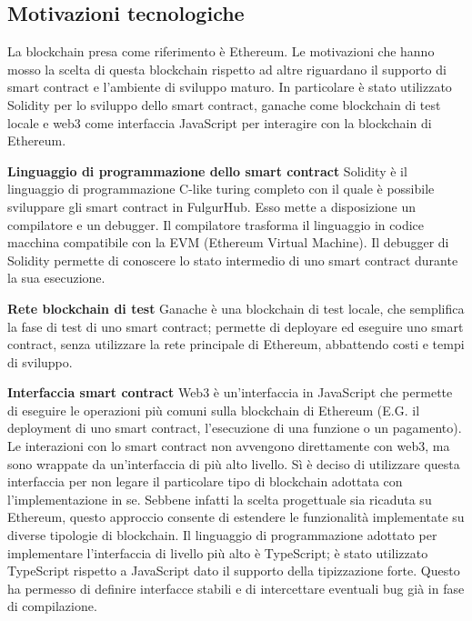 \documentclass[12pt,italian,]{book}
\begin{document}
\hypertarget{motivazioni-tecnologiche}{%
\subsection{Motivazioni tecnologiche}\label{motivazioni-tecnologiche}}

La blockchain presa come riferimento è Ethereum. Le motivazioni che hanno mosso la scelta di questa blockchain rispetto ad altre riguardano il supporto di smart contract e l'ambiente di sviluppo maturo. In particolare è stato utilizzato Solidity per lo sviluppo dello smart contract, ganache come blockchain di test locale e web3 come interfaccia JavaScript per interagire con la blockchain di Ethereum.

\textbf{\textbf{Linguaggio di programmazione dello smart contract}} Solidity è il linguaggio di programmazione C-like turing completo con il quale è possibile sviluppare gli smart contract in FulgurHub. Esso mette a disposizione un compilatore e un debugger. Il compilatore trasforma il linguaggio in codice macchina compatibile con la EVM (Ethereum Virtual Machine). Il debugger di Solidity permette di conoscere lo stato intermedio di uno smart contract durante la sua esecuzione.

\textbf{\textbf{Rete blockchain di test}} Ganache è una blockchain di test locale, che semplifica la fase di test di uno smart contract; permette di deployare ed eseguire uno smart contract, senza utilizzare la rete principale di Ethereum, abbattendo costi e tempi di sviluppo.

\textbf{\textbf{Interfaccia smart contract}} Web3 è un'interfaccia in JavaScript che permette di eseguire le operazioni più comuni sulla blockchain di Ethereum (E.G. il deployment di uno smart contract, l'esecuzione di una funzione o un pagamento). Le interazioni con lo smart contract non avvengono direttamente con web3, ma sono wrappate da un'interfaccia di più alto livello. Sì è deciso di utilizzare questa interfaccia per non legare il particolare tipo di blockchain adottata con l'implementazione in se. Sebbene infatti la scelta progettuale sia ricaduta su Ethereum, questo approccio consente di estendere le funzionalità implementate su diverse tipologie di blockchain. Il linguaggio di programmazione adottato per implementare l'interfaccia di livello più alto è TypeScript; è stato utilizzato TypeScript rispetto a JavaScript dato il supporto della tipizzazione forte. Questo ha permesso di definire interfacce stabili e di intercettare eventuali bug già in fase di compilazione.
\end{document}
